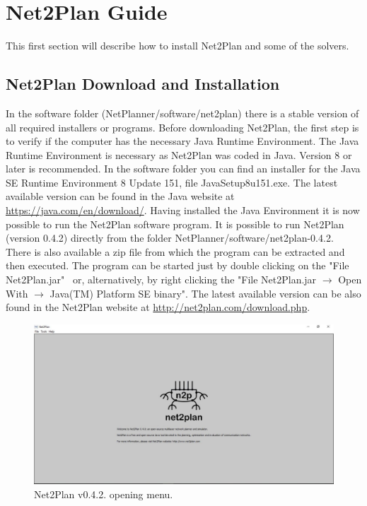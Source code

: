 \clearpage

\graphicspath{{./figures/}}
\section{Net2Plan Guide}\label{net2plan_guide}
This first section will describe how to install Net2Plan and some of the solvers.

    \subsection*{Net2Plan Download and Installation}
    \vspace{0.5cm}

    In the software folder (NetPlanner/software/net2plan) there is a stable version of all required installers or programs.
    \noindent
	Before downloading Net2Plan, the first step is to verify if the computer has the necessary Java Runtime Environment.
    The Java Runtime Environment is necessary as Net2Plan was coded in Java.
    Version 8 or later is recommended.
    In the software folder you can find an installer for the Java SE Runtime Environment 8 Update 151, file JavaSetup8u151.exe.
    The latest available version can be found in the Java website at \url{https://java.com/en/download/}.
	\noindent	
    Having installed the Java Environment it is now possible to run the Net2Plan software program.
    It is possible to run Net2Plan (version  0.4.2) directly from the folder NetPlanner/software/net2plan-0.4.2.
    There is also available a zip file from which the program can be extracted and then executed.
    The program can be started just by double clicking on the "File Net2Plan.jar" \ or, alternatively, by right clicking the "File Net2Plan.jar $\rightarrow$ Open With $\rightarrow$ Java(TM) Platform SE binary".
    The latest available version can be also found in the Net2Plan website at \url{http://net2plan.com/download.php}.

    \begin{figure}[h!]
       	\centering
       	\includegraphics[width = 13cm]{Net2Plan.pdf}
       	\caption{Net2Plan v0.4.2. opening menu.}
    \end{figure}

